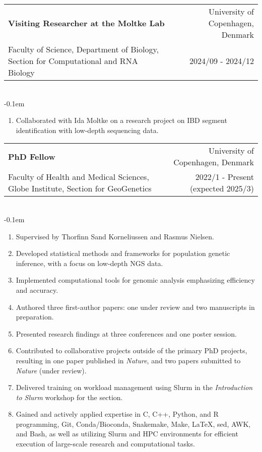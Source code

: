 \documentclass[letterpaper,10.5pt]{article}
\makeatletter
\newcommand{\cvSubheading}[5]{
  \vspace{-1pt}\item
    \begin{tabular*}{0.97\textwidth}{l@{\extracolsep{\fill}}r}
      \textbf{#1} & #2 \\
      {\small#3} & {\small #4} \\
    \end{tabular*}\vspace{3pt} \\
    #5
}
\makeatother
\begin{document}
         \cvSubheading
        {Visiting Researcher at the Moltke Lab}
        {University of Copenhagen, Denmark}
        {Faculty of Science, Department of Biology, Section for Computational and RNA Biology}
        {2024/09 - 2024/12}
          \vspace{-0.1em} \begin{enumerate}[label=\textbf{-},nosep,wide,  labelindent=0pt]
        \item Collaborated with Ida Moltke on a research project on IBD segment identification with low-depth sequencing data.
    \end{enumerate}

        \cvSubheading
        {PhD Fellow}
        {University of Copenhagen, Denmark}
        {Faculty of Health and Medical Sciences, Globe Institute, Section for GeoGenetics}
        {2022/1 - Present (expected 2025/3)}
            \vspace{-0.1em} \begin{enumerate}[label=\textbf{-},nosep,wide,  labelindent=0pt]
        \item Supervised by Thorfinn Sand Korneliussen and Rasmus Nielsen.
        \item Developed statistical methods and frameworks for population genetic inference, with a focus on low-depth NGS data.
        \item Implemented computational tools for genomic analysis emphasizing efficiency and accuracy.
        \item Authored three first-author papers: one under review and two manuscripts in preparation.
        \item Presented research findings at three conferences and one poster session.
        \item Contributed to collaborative projects outside of the primary PhD projects, resulting in one paper published in \textit{Nature}, and two papers submitted to \textit{Nature} (under review).
        \item Delivered training on workload management using Slurm in the \textit{Introduction to Slurm} workshop for the section.
        \item Gained and actively applied expertise in C, C++, Python, and R programming, Git, Conda/Bioconda, Snakemake, Make, \LaTeX, sed, AWK, and Bash, as well as utilizing Slurm and HPC environments for efficient execution of large-scale research and computational tasks.

      \end{enumerate}
    \medskip
  
\end{document}
